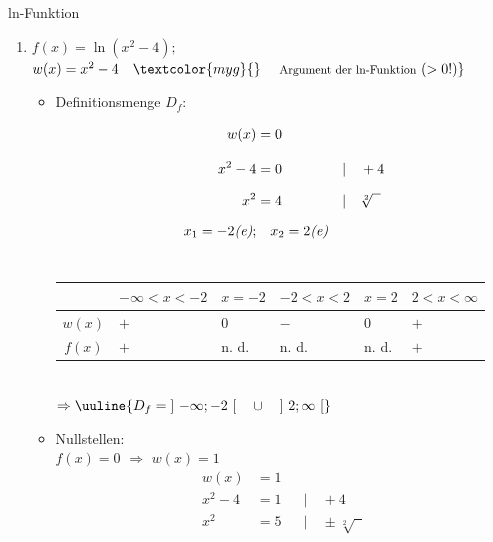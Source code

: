 \begin{Example}{ln-Funktion}{}
    \begin{enumerate}
        \item [a)]{
            $f(x) = \ln(x^2 -4);$ \qquad $w(x) = x^2 -4 \quad \textcolor{myg}{\text{\} \quad \footnotesize Argument der ln-Funktion} \ (> 0!)}$\\[-2.0ex]
            \begin{itemize}[leftmargin=*]
                \item Definitionsmenge $D_{f}$:\\{
                    \vspace{-2.0ex}
                    \begin{align*}
                        w(x) &= 0 &&\\[2.0ex]
                        x^2 - 4 &= 0 &&| \quad + 4\\[1.5ex]
                        x^2 &= 4 &&| \quad \sqrt[2]{\phantom{x}}\\[1.5ex]
                        x_{1} = -2 \text{\textit{(e)}}; &\quad x_{2} = 2 \text{\textit{(e)}} &&
                    \end{align*}\\
                    \begin{tabularx}{0.8\linewidth}{c|l|l|l|l|l}
                        & $-\infty < x < -2$ & $x = -2$ & $-2 < x < 2$ & $x = 2$ & $2 < x < \infty$ \\ \hline
                        $w(x)$ & $+$ & $0$ & $-$ & $0$ & $+$ \\ \hline
                        $f(x)$ & $+$ & n. d. & n. d. & n. d. & $+$ \\                   
                    \end{tabularx}\\[3.0ex]
                    $\Rightarrow \uuline{D_{f} = \left] \ -\infty; -2 \ \right[ \quad \cup \quad \left] \ 2; \infty \ \right[}$\\
                    }
                \item Nullstellen:\\[2.0ex]{
                    $f(x) = 0$ \qquad $\Rightarrow$ \quad $w(x) = 1$\\[-1.0ex]
                    \begin{align*}
                        w(x) &= 1 \\[1.5ex]
                        x^2 - 4 &= 1 &&| \quad + 4\\[1.5ex]
                        x^2 &= 5 &&| \quad \pm\sqrt[2]{\phantom{x}}\\[1.5ex]

\end{align*}}
\end{itemize}}
\end{enumerate}
\end{Example}
